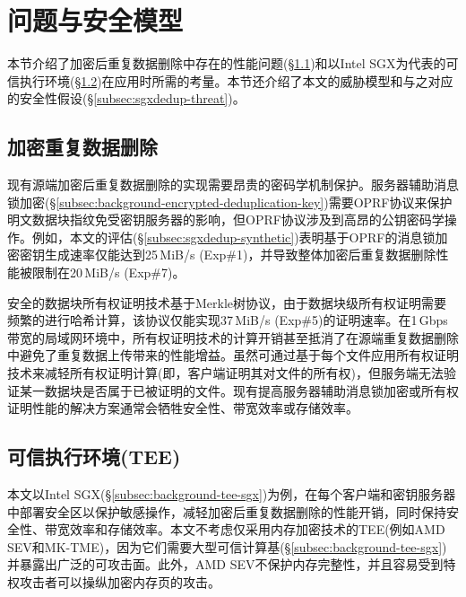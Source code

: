 \section{问题与安全模型}
\label{sec:sgxdedup-background}

本节介绍了加密后重复数据删除中存在的性能问题(\S\ref{subsec:sgxdedup-problem})和以Intel SGX为代表的可信执行环境(\S\ref{subsec:sgxdedup-sgx})在应用时所需的考量。本节还介绍了本文的威胁模型和与之对应的安全性假设(\S\ref{subsec:sgxdedup-threat})。

\subsection{加密重复数据删除}
\label{subsec:sgxdedup-problem}

现有源端加密后重复数据删除的实现需要昂贵的密码学机制保护。服务器辅助消息锁加密(\S\ref{subsec:background-encrypted-deduplication-key})需要OPRF协议\cite{naor2004Number}来保护明文数据块指纹免受密钥服务器的影响，但OPRF协议涉及到高昂的公钥密码学操作。例如，本文的评估(\S\ref{subsec:sgxdedup-synthetic})表明基于OPRF的消息锁加密密钥生成速率仅能达到25\,MiB/s (Exp\#1)，并导致整体加密后重复数据删除性能被限制在20\,MiB/s (Exp\#7)。

安全的数据块所有权证明技术基于Merkle树协议，由于数据块级所有权证明需要频繁的进行哈希计算，该协议仅能实现37\,MiB/s (Exp\#5)的证明速率。在1\,Gbps带宽的局域网环境中，所有权证明技术的计算开销甚至抵消了在源端重复数据删除中避免了重复数据上传带来的性能增益。虽然可通过基于每个文件应用所有权证明技术来减轻所有权证明计算(即，客户端证明其对文件的所有权)，但服务端无法验证某一数据块是否属于已被证明的文件。现有提高服务器辅助消息锁加密或所有权证明性能的解决方案通常会牺牲安全性\cite{li2020TED,xu2013weak,pietro12}、带宽效率\cite{harnik2010side,li15}或存储效率\cite{zhou2015secdep,qin17,li2020TED}。


\subsection{可信执行环境(TEE)}
\label{subsec:sgxdedup-sgx}

本文以Intel SGX\cite{sgx}(\S\ref{subsec:background-tee-sgx})为例，在每个客户端和密钥服务器中部署安全区以保护敏感操作，减轻加密后重复数据删除的性能开销，同时保持安全性、带宽效率和存储效率。本文不考虑仅采用内存加密技术的TEE(例如AMD SEV\cite{AMDSEV}和MK-TME\cite{MK-TME})，因为它们需要大型可信计算基(\S\ref{subsec:background-tee-sgx})并暴露出广泛的可攻击面\cite{mofrad18}。此外，AMD SEV\cite{AMDSEV}不保护内存完整性，并且容易受到特权攻击者可以操纵加密内存页\cite{mofrad18}的攻击。


